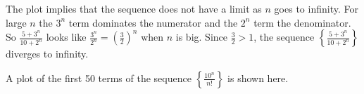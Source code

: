 \begin{activitySolution}
\begin{center}  \end{center}
The plot implies that the sequence does not have a limit as $n$ goes to infinity. For large $n$ the $3^n$ term dominates the numerator and the $2^n$ term the denominator. So $\frac{5+3^n}{10+2^n}$ looks like $\frac{3^n}{2^n} = \left(\frac{3}{2}\right)^n$ when $n$ is big. Since $\frac{3}{2} > 1$, the sequence $\left\{\frac{5+3^n}{10+2^n}\right\}$ diverges to infinity.
    \item A plot of the first 50 terms of the sequence $\left\{\frac{10^n}{n!}\right\}$ is shown here.
\begin{center}  \end{center}

\end{activitySolution}

